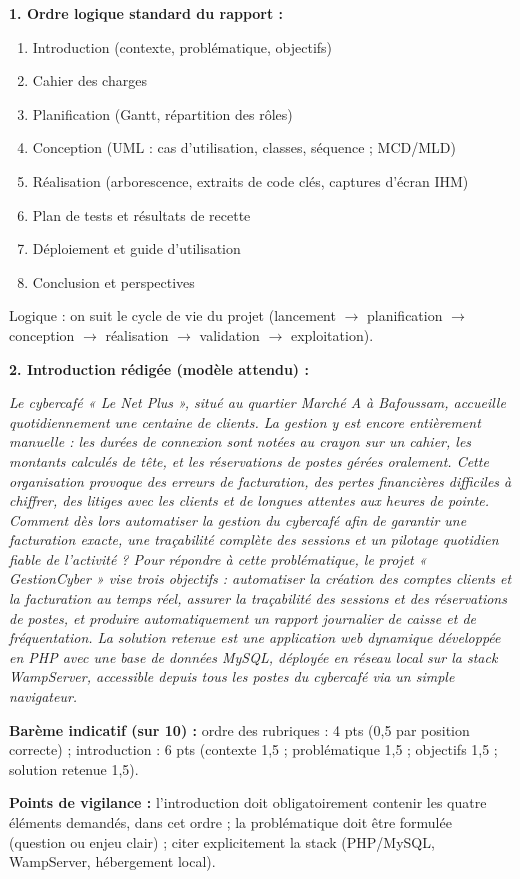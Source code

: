 \documentclass[11pt]{article}
\begin{document}
\begin{corrige}
\textbf{1. Ordre logique standard du rapport :}
\begin{enumerate}
    \item Introduction (contexte, problématique, objectifs)
    \item Cahier des charges
    \item Planification (Gantt, répartition des rôles)
    \item Conception (UML : cas d'utilisation, classes, séquence ; MCD/MLD)
    \item Réalisation (arborescence, extraits de code clés, captures d'écran IHM)
    \item Plan de tests et résultats de recette
    \item Déploiement et guide d'utilisation
    \item Conclusion et perspectives
\end{enumerate}
Logique : on suit le cycle de vie du projet (lancement $\to$ planification $\to$ conception $\to$ réalisation $\to$ validation $\to$ exploitation).

\textbf{2. Introduction rédigée (modèle attendu) :}

\emph{Le cybercafé « Le Net Plus », situé au quartier Marché A à Bafoussam, accueille quotidiennement une centaine de clients. La gestion y est encore entièrement manuelle : les durées de connexion sont notées au crayon sur un cahier, les montants calculés de tête, et les réservations de postes gérées oralement. Cette organisation provoque des erreurs de facturation, des pertes financières difficiles à chiffrer, des litiges avec les clients et de longues attentes aux heures de pointe. Comment dès lors automatiser la gestion du cybercafé afin de garantir une facturation exacte, une traçabilité complète des sessions et un pilotage quotidien fiable de l'activité ? Pour répondre à cette problématique, le projet « GestionCyber » vise trois objectifs : automatiser la création des comptes clients et la facturation au temps réel, assurer la traçabilité des sessions et des réservations de postes, et produire automatiquement un rapport journalier de caisse et de fréquentation. La solution retenue est une application web dynamique développée en PHP avec une base de données MySQL, déployée en réseau local sur la stack WampServer, accessible depuis tous les postes du cybercafé via un simple navigateur.}

\textbf{Barème indicatif (sur 10) :} ordre des rubriques : 4 pts (0,5 par position correcte) ; introduction : 6 pts (contexte 1,5 ; problématique 1,5 ; objectifs 1,5 ; solution retenue 1,5).

\textbf{Points de vigilance :} l'introduction doit obligatoirement contenir les quatre éléments demandés, dans cet ordre ; la problématique doit être formulée (question ou enjeu clair) ; citer explicitement la stack (PHP/MySQL, WampServer, hébergement local).
\end{corrige}
\end{document}
